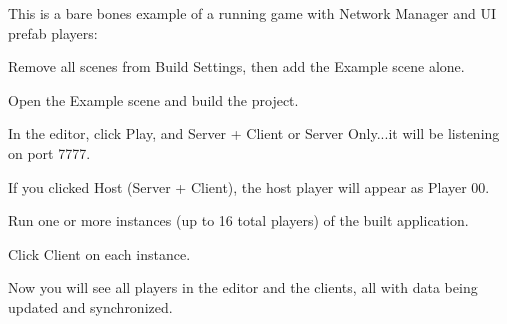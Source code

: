 This is a bare bones example of a running game with Network Manager and UI prefab players\+:


\begin{DoxyEnumerate}
\item Remove all scenes from Build Settings, then add the Example scene alone.
\item Open the Example scene and build the project.
\item In the editor, click Play, and Server + Client or Server Only...it will be listening on port 7777. ~\newline

\begin{DoxyItemize}
\item If you clicked Host (Server + Client), the host player will appear as Player 00.
\end{DoxyItemize}
\item Run one or more instances (up to 16 total players) of the built application.
\item Click Client on each instance.
\item Now you will see all players in the editor and the clients, all with data being updated and synchronized. 
\end{DoxyEnumerate}